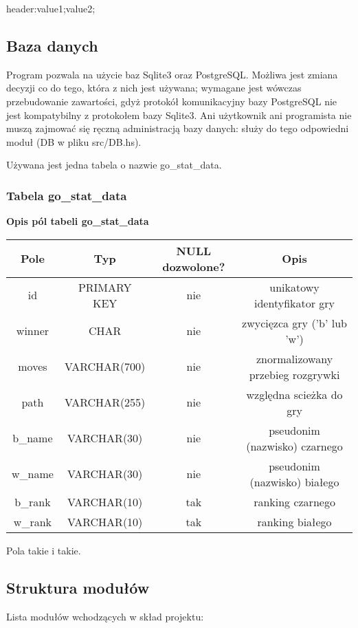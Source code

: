 \documentclass[11pt,leqno]{article}
\begin{document}
header:value1;value2;

\subsection{Baza danych}

Program pozwala na użycie baz Sqlite3 oraz PostgreSQL. Możliwa jest zmiana decyzji co do tego, która z nich jest używana; 
wymagane jest wówczas przebudowanie zawartości, gdyż protokół komunikacyjny bazy PostgreSQL nie jest kompatybilny z protokołem
bazy Sqlite3. Ani użytkownik ani programista nie muszą zajmować się ręczną administracją bazy danych: służy do tego odpowiedni
moduł (DB w pliku src/DB.hs). 

Używana jest jedna tabela o nazwie go\_stat\_data.

\subsubsection{Tabela go\_stat\_data}

\begin{center}
\textbf{Opis pól tabeli go\_stat\_data}
\renewcommand{\arraystretch}{1.5}
\begin{tabular}{| c | c | c | c | } \hline
 Pole    & Typ          & NULL dozwolone? & Opis \\ \hline
 id      & PRIMARY KEY  & nie & unikatowy identyfikator gry \\ \hline
 winner  & CHAR         & nie & zwycięzca gry ('b' lub 'w') \\ \hline
 moves   & VARCHAR(700) & nie & znormalizowany przebieg rozgrywki \\ \hline
 path    & VARCHAR(255) & nie & względna scieżka do gry \\ \hline
 b\_name & VARCHAR(30)  & nie & pseudonim (nazwisko) czarnego \\ \hline
 w\_name & VARCHAR(30)  & nie & pseudonim (nazwisko) białego \\ \hline
 b\_rank & VARCHAR(10)  & tak & ranking czarnego \\ \hline
 w\_rank & VARCHAR(10)  & tak & ranking białego \\ \hline
\end{tabular}


\end{center}


Pola takie i takie.

\subsection{Struktura modułów}
Lista modułów wchodzących w skład projektu:
\end{document}

